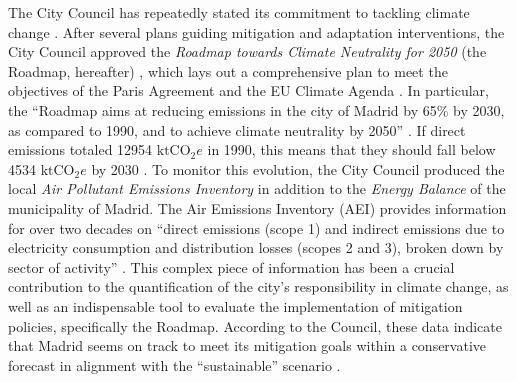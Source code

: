 \documentclass[
  10pt,
  twocolumn]{aft}
\begin{document}
The City Council has repeatedly stated its commitment to tackling
climate change \citep{am_inventario_2021}. After several plans guiding
mitigation and adaptation interventions, the City Council approved the
\emph{Roadmap towards Climate Neutrality for 2050} (the Roadmap,
hereafter) \citep{amRoadmapClimateNeutrality2022}, which lays out a
comprehensive plan to meet the objectives of the Paris Agreement and the
EU Climate Agenda \citep{JRC130230}. In particular, the ``Roadmap aims
at reducing emissions in the city of Madrid by 65\% by 2030, as compared
to 1990, and to achieve climate neutrality by 2050''
\citep[p.3]{amRoadmapClimateNeutrality2022}. If direct emissions totaled
12954 \(\text{ktCO}_2e\) in 1990, this means that they should fall below
4534 \(\text{ktCO}_2e\) by 2030
\citep[12]{amRoadmapClimateNeutrality2022}. To monitor this evolution,
the City Council produced the local \emph{Air Pollutant Emissions
Inventory} in addition to the \emph{Energy Balance} of the municipality
of Madrid. The Air Emissions Inventory (AEI) provides information for
over two decades on ``direct emissions (scope 1) and indirect emissions
due to electricity consumption and distribution losses (scopes 2 and 3),
broken down by sector of activity''
\citep[p.6]{amRoadmapClimateNeutrality2022}. This complex piece of
information has been a crucial contribution to the quantification of the
city's responsibility in climate change, as well as an indispensable
tool to evaluate the implementation of mitigation policies, specifically
the Roadmap. According to the Council, these data indicate that Madrid
seems on track to meet its mitigation goals within a conservative
forecast in alignment with the ``sustainable'' scenario
\citep{JRC130230, amRoadmapClimateNeutrality2022}.
\end{document}
